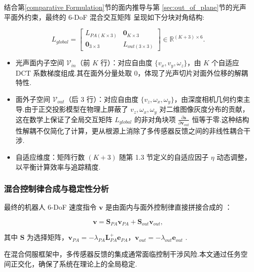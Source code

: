 \documentclass{article}
\begin{document}
结合第\cref{comparative Formulation}节的面内推导与第 \cref{sec:out_of_plane}节的光声平面外约束，最终的 6-DoF 混合交互矩阵 呈现如下分块对角结构:

\begin{equation}
    L_{global} = \begin{bmatrix} L_{PA(K \times 3)} & \mathbf{0}_{K \times 3} \\ \mathbf{0}_{3 \times 3} & L_{out(3 \times 3)} \end{bmatrix} \in \mathbb{R}^{(K+3) \times 6}.
\end{equation}

\begin{itemize}
    \item 光声面内子空间 $\mathcal{V}_{in}$（前 $K$ 行）：对应自由度 $\{v_x, v_y, \omega_z\}$，由 $K$ 个自适应 DCT 系数梯度组成.其在面外分量处取 0，体现了光声切片对面外位移的解耦特性.
    \item 面外子空间 $\mathcal{V}_{out}$（后 3 行）：对应自由度 $\{v_z, \omega_x, \omega_y\}$，由深度相机几何约束主导.由于正交投影模型在物理上屏蔽了 $v_z, \omega_x, \omega_y$ 对二维图像灰度分布的贡献，这在数学上保证了全局交互矩阵 $L_{global}$ 的非对角块项 $\frac{\partial \mathbf{s}}{\partial \mathbf{v}_{out}}$ 恒等于零.这种结构性解耦不仅简化了计算，更从根源上消除了多传感器反馈之间的非线性耦合干涉.
    \item 自适应维度：矩阵行数 $(K+3)$ 随第 1.3 节定义的自适应因子 $\eta$ 动态调整，以平衡计算效率与追踪精度.
\end{itemize}


\subsubsection{混合控制律合成与稳定性分析}
最终的机器人 6-DoF 速度指令 $\mathbf{v}$ 是由面内与面外控制律直接拼接合成的 ：

\begin{equation}
    \mathbf{v} = \mathbf{S}_{PA} \mathbf{v}_{PA} + \mathbf{S}_{out} \mathbf{v}_{out},
\end{equation}

其中 $\mathbf{S}$ 为选择矩阵，$\mathbf{v}_{PA} = -\lambda_{PA} \mathbf{L}_{PA}^+ \mathbf{e}_{PA}$，$\mathbf{v}_{out} = -\lambda_{out} \mathbf{e}_{out}$ .

在混合伺服框架中，多传感器反馈的集成通常面临控制干涉风险.本文通过任务空间正交化，确保了系统在理论上的全局稳定.
\end{document}
